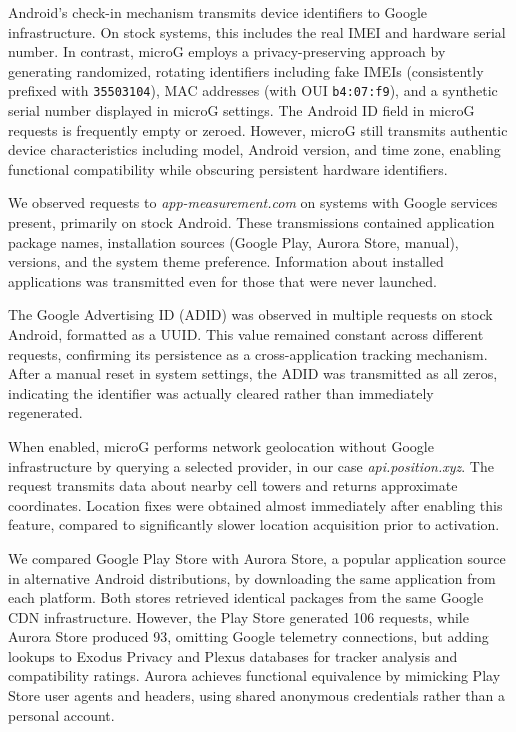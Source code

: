 Android's check-in mechanism transmits device identifiers to Google infrastructure. On stock systems, this includes the real IMEI and hardware serial number. In contrast, microG employs a privacy-preserving approach by generating randomized, rotating identifiers including fake IMEIs (consistently prefixed with \texttt{35503104}), MAC addresses (with OUI \texttt{b4:07:f9}), and a synthetic serial number displayed in microG settings. The Android ID field in microG requests is frequently empty or zeroed. However, microG still transmits authentic device characteristics including model, Android version, and time zone, enabling functional compatibility while obscuring persistent hardware identifiers.

We observed requests to \textit{app-measurement.com} on systems with Google services present, primarily on stock Android. These transmissions contained application package names, installation sources (Google Play, Aurora Store, manual), versions, and the system theme preference. Information about installed applications was transmitted even for those that were never launched.

The Google Advertising ID (ADID) was observed in multiple requests on stock Android, formatted as a UUID. This value remained constant across different requests, confirming its persistence as a cross-application tracking mechanism. After a manual reset in system settings, the ADID was transmitted as all zeros, indicating the identifier was actually cleared rather than immediately regenerated.

When enabled, microG performs network geolocation without Google infrastructure by querying a selected provider, in our case \textit{api.position.xyz}. The request transmits data about nearby cell towers and returns approximate coordinates. Location fixes were obtained almost immediately after enabling this feature, compared to significantly slower location acquisition prior to activation.

We compared Google Play Store with Aurora Store, a popular application source in alternative Android distributions, by downloading the same application from each platform. Both stores retrieved identical packages from the same Google CDN infrastructure. However, the Play Store generated 106 requests, while Aurora Store produced 93, omitting Google telemetry connections, but adding lookups to Exodus Privacy and Plexus databases for tracker analysis and compatibility ratings. Aurora achieves functional equivalence by mimicking Play Store user agents and headers, using shared anonymous credentials rather than a personal account.

